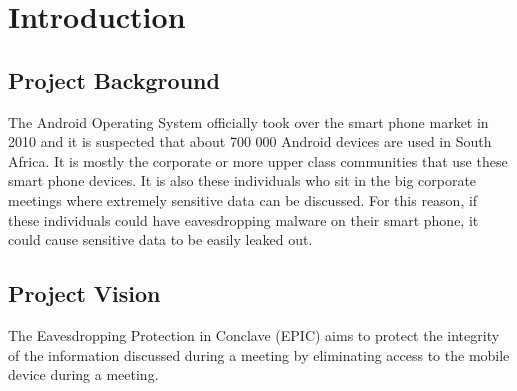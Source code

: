 
\begin{comment}
\documentclass{article}
\usepackage[utf8]{inputenc}
\usepackage{graphicx}
\usepackage{hyperref}
\usepackage{float}


\DeclareGraphicsExtensions{.jpg}
\graphicspath{{./Images/}}

\end{comment}
	
	
	\newpage
	\tableofcontents
	\newpage
	\section{Introduction}
	\subsection{Project Background}

The Android Operating System officially took over the smart phone market in 2010 and it is suspected that about 700 000 Android devices are used in South Africa. It is mostly the corporate or more upper class communities that use these smart phone devices. It is also these individuals who sit in the big corporate meetings where extremely sensitive data can be discussed. For this reason, if these individuals could have eavesdropping malware on their smart phone, it could cause sensitive data to be easily leaked out.


	\subsection{Project Vision} 
	The Eavesdropping Protection in Conclave (EPIC) aims to protect the integrity of the information discussed during a meeting by eliminating access to the mobile device during a meeting.


